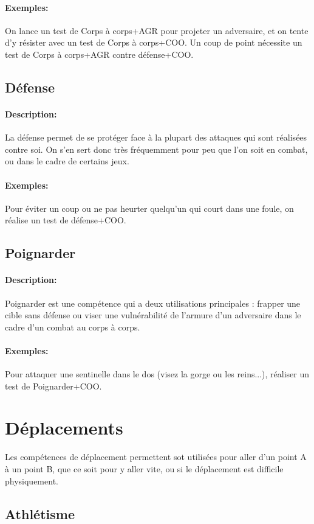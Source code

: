 \documentclass[10pt,a4paper,twocolumn]{book}
\begin{document}
\paragraph{Exemples:}On lance un test de Corps à corps+AGR pour projeter un adversaire, et on tente d'y résister avec un test de Corps à corps+COO. Un coup de point nécessite un test de Corps à corps+AGR contre défense+COO. 
\subsection{Défense}
\paragraph{Description:}La défense permet de se protéger face à la plupart des attaques qui sont réalisées contre soi. On s'en sert donc très fréquemment pour peu que l'on soit en combat, ou dans le cadre de certains jeux.
\paragraph{Exemples:}Pour éviter un coup ou ne pas heurter quelqu'un qui court dans une foule, on réalise un test de défense+COO.
\subsection{Poignarder}
\paragraph{Description:}Poignarder est une compétence qui a deux utilisations principales : frapper une cible sans défense ou viser une vulnérabilité de l'armure d'un adversaire dans le cadre d'un combat au corps à corps.
\paragraph{Exemples:}Pour attaquer une sentinelle dans le dos (visez la gorge ou les reins...), réaliser un test de Poignarder+COO.

\section{Déplacements}
Les compétences de déplacement permettent sot utilisées pour aller d'un point A à un point B, que ce soit pour y aller vite, ou si le déplacement est difficile physiquement.
\subsection{Athlétisme}
\end{document}
